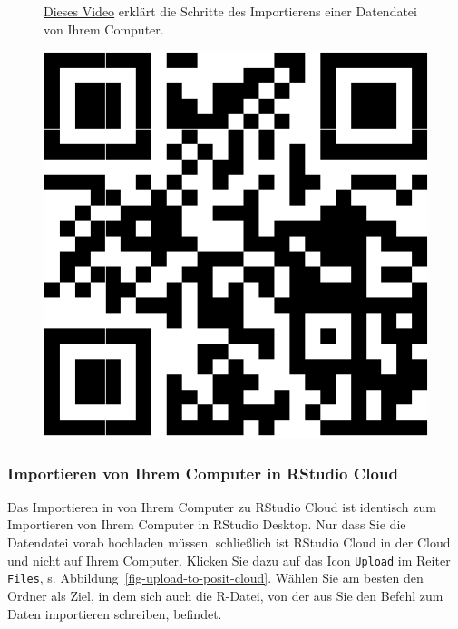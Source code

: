 \documentclass[
  letterpaper,
  oneside,
  open=any]{scrbook}
\theoremstyle{definition}
\theoremstyle{definition}
\theoremstyle{definition}
\theoremstyle{remark}
\begin{document}
\begin{figure}

\begin{minipage}{0.80\linewidth}
\href{https://youtu.be/B_nuN-M0pQM}{Dieses Video} erklärt die Schritte
des Importierens einer Datendatei von Ihrem Computer.\end{minipage}%
%
\begin{minipage}{0.20\linewidth}

\begin{center}
\includegraphics[width=0.75\linewidth,height=\textheight,keepaspectratio]{020-R_files/figure-pdf/unnamed-chunk-31-1.pdf}
\end{center}

\end{minipage}%

\end{figure}%

\subsubsection{Importieren von Ihrem Computer in RStudio
Cloud}\label{importieren-von-ihrem-computer-in-rstudio-cloud}

Das Importieren in von Ihrem Computer zu RStudio Cloud ist identisch zum
Importieren von Ihrem Computer in RStudio Desktop. Nur dass Sie die
Datendatei vorab hochladen müssen, schließlich ist RStudio Cloud in der
Cloud und nicht auf Ihrem Computer. Klicken Sie dazu auf das Icon
\texttt{Upload} im Reiter \texttt{Files}, s.
Abbildung~\ref{fig-upload-to-posit-cloud}. Wählen Sie am besten den
Ordner als Ziel, in dem sich auch die R-Datei, von der aus Sie den
Befehl zum Daten importieren schreiben, befindet.
\end{document}
